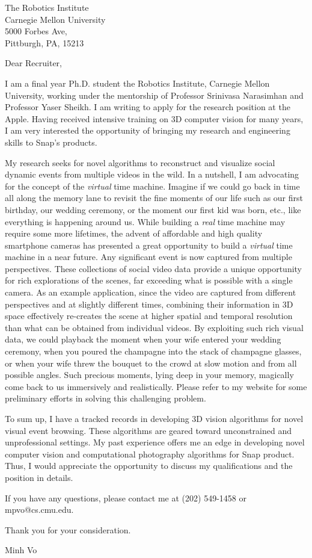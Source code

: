 \documentclass{letter}
\begin{document}
\begin{letter}{The Robotics Institute\\
Carnegie Mellon University\\
5000 Forbes Ave,\\
Pittburgh, PA, 15213}


\opening{Dear Recruiter,}

I am a final year Ph.D. student the Robotics Institute, Carnegie Mellon University, working under the mentorship of Professor Srinivasa Narasimhan and Professor Yaser Sheikh. I am writing to apply for the research position at the Apple. Having received intensive training on 3D computer vision for many years, I am very interested the opportunity of bringing my research and engineering skills to Snap's products.

My research seeks for novel algorithms to reconstruct and visualize social dynamic events from multiple videos in the wild. In a nutshell, I am advocating for the concept of the \textit{virtual} time machine. Imagine if we could go back in time all along the memory lane to revisit the fine moments of our life such as our first birthday, our wedding ceremony, or the moment our first kid was born, etc., like everything is happening around us. While building a \textit{real} time machine may require some more lifetimes, the advent of affordable and high quality smartphone cameras has presented a great opportunity to build a \textit{virtual} time machine in a near future. Any significant event is now captured from multiple perspectives. These collections of social video data provide a unique opportunity for rich explorations of the scenes, far exceeding what is possible with a single camera. As an example application, since the video are captured from different perspectives and at slightly different times, combining their information in 3D space effectively re-creates the scene at higher spatial and temporal resolution than what can be obtained from individual videos. By exploiting such rich visual data, we could playback the moment when your wife entered your wedding ceremony, when you poured the champagne into the stack of champagne glasses, or when your wife threw the bouquet to the crowd at slow motion and from all possible angles. Such precious moments, lying deep in your memory, magically come back to us immersively and realistically. Please refer to my website for some preliminary efforts in solving this challenging problem.

To sum up, I have a tracked records in developing 3D vision algorithms for novel visual event browsing. These algorithms are geared toward unconstrained and unprofessional settings. My past experience offers me an edge in developing novel computer vision and computational photography algorithms for Snap product. Thus, I would appreciate the opportunity to discuss my qualifications and the position in details.

If you have any questions, please contact me at (202) 549-1458 or mpvo@cs.cmu.edu.

Thank you for your consideration.


\closing{Minh Vo
}


\end{letter}
\end{document}
